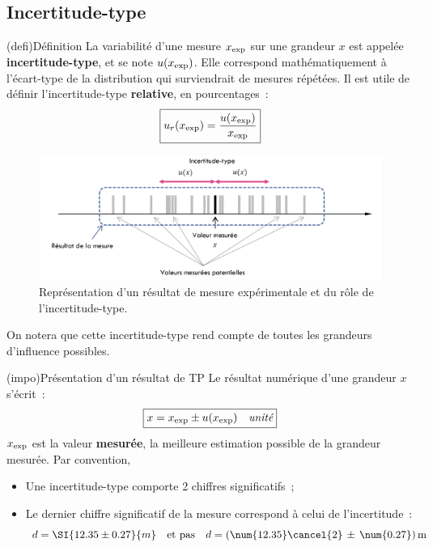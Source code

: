 \documentclass[../main/main.tex]{subfiles}
\begin{document}
\subsection{Incertitude-type}
\begin{tcb}[sidebyside, righthand ratio=.3](defi){Définition}
  La variabilité d'une mesure $x_{\rm exp}$ sur une grandeur $x$ est appelée
  \textbf{incertitude-type}, et se note $u(x_{\rm exp})$. Elle correspond
  mathématiquement à l'écart-type de la distribution qui surviendrait de mesures
  répétées.
  \tcblower
  Il est utile de définir l'incertitude-type \textbf{relative}, en
  pourcentages~:
  \[
    \boxed{u_r(x_{\rm exp}) = \frac{u(x_{\rm exp})}{x_{\rm exp}}}
  \]
\end{tcb}
\begin{figure}[htbp]
  \centering
  \includegraphics[scale=1]{inctype}
  \caption{Représentation d'un résultat de mesure expérimentale et du rôle de
  l'incertitude-type.}
  \label{fig:inctype}
\end{figure}
On notera que cette incertitude-type rend compte de toutes les grandeurs
d'influence possibles.

\begin{tcb}[sidebyside, lefthand ratio=.4](impo){Présentation d'un résultat de
  TP}
  Le résultat numérique d'une grandeur $x$ s'écrit~:
  \[
    \boxed{x = x_{\rm exp} \pm u(x_{\rm exp}) \quad \textit{unité}}
  \]
  $x_{\rm exp}$ est la valeur \textbf{mesurée}, la meilleure estimation possible
  de la grandeur mesurée.
  \tcblower
  Par convention,
  \begin{itemize}[label=$\diamond$, leftmargin=10pt]
    \item Une incertitude-type comporte 2 chiffres significatifs~;
    \item Le dernier chiffre significatif de la mesure correspond à celui de
      l'incertitude~:
      \[
        d = \SI{12.35\pm0.27}{m}
        \quad \text{et pas} \quad 
        d = (\num{12.35}\cancel{2}\,\pm\,\num{0.27})\,\rm  m
      \]
  \end{itemize}
\end{tcb}
\end{document}
